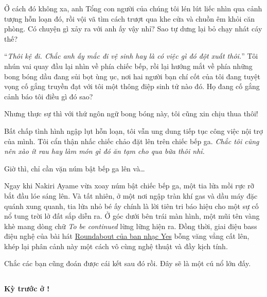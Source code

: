 \documentclass[../main.tex]{subfiles}
\begin{document}

Ở cách đó không xa, anh Tổng con người của chúng tôi lén lút liếc nhìn qua cảnh tượng hỗn loạn đó, rồi vội vã tìm cách trượt qua khe cửa và chuồn êm khỏi căn phòng. Có chuyện gì xảy ra với anh ấy vậy nhỉ? Sao tự dưng lại bỏ chạy nhát cáy thế?

``\textit{Thôi kệ đi. Chắc anh ấy mắc đi vệ sinh hay là có việc gì đó đột xuất thôi.}'' Tôi nhún vai quay đầu lại nhìn về phía chiếc bếp, rồi lại hướng mắt về phía những bong bóng dầu đang sủi bọt ùng ục, nơi hai người bạn chí cốt của tôi đang tuyệt vọng cố gắng truyền đạt với tôi một thông điệp sinh tử nào đó. Họ đang cố gắng cảnh báo tôi điều gì đó sao?

Nhưng thực sự thì với thứ ngôn ngữ bong bóng này, tôi cũng xin chịu thua thôi!

Bất chấp tình hình ngập lụt hỗn loạn, tôi vẫn ung dung tiếp tục công việc nội trợ của mình. Tôi cẩn thận nhấc chiếc chảo đặt lên trên chiếc bếp ga. \textit{Chắc tôi cũng nên xào ít rau hay làm món gì đó ăn tạm cho qua bữa thôi nhỉ.}

Giờ thì, chỉ cần vặn núm bật bếp ga lên và\dots

\pov{-}

Ngay khi Nakiri Ayame vừa xoay núm bật chiếc bếp ga, một tia lửa mồi rực rỡ bắt đầu lóe sáng lên. Và tất nhiên, ở một nơi ngập tràn khí gas và dầu máy đặc quánh xung quanh, tia lửa nhỏ bé ấy chính là lời tiên tri báo hiệu cho một sự cố nổ tung trời lở đất sắp diễn ra. Ở góc dưới bên trái màn hình, một mũi tên vàng khè mang dòng chữ \textit{To be continued} lừng lững hiện ra. Đồng thời, giai điệu bass điệu nghệ của bài hát \href{https://www.youtube.com/watch?v=cPCLFtxpadE&t=40s}{Roundabout của ban nhạc Yes} bỗng văng vẳng cất lên, khép lại phân cảnh này một cách vô cùng nghệ thuật và đầy kịch tính.


Chắc các bạn cũng đoán được cái kết sau đó rồi. Đây sẽ là một cú nổ lớn đấy.
\omk

\subsection*{\label{ep-003.VII}}

\begin{center}
  \textbf{Kỳ trước ở \hll !}
\end{center}
\end{document}
